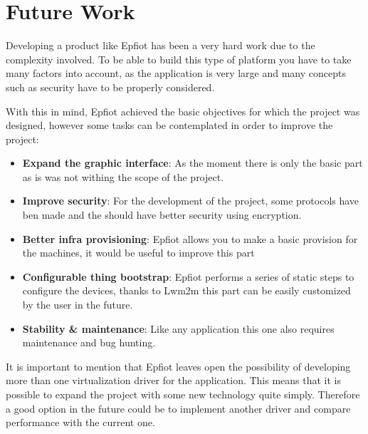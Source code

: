 \newpage
\section{Future Work}
\label{makereference7.2}

Developing a product like Epfiot has been a very hard work due to the complexity involved. To be able to build this type of platform you have to take many factors into account, as the application is very large and many concepts such as security have to be properly considered.

With this in mind, Epfiot achieved the basic objectives for which the project was designed, however some tasks can be contemplated in order to improve the project:

\begin{itemize}
    \item \textbf{Expand the graphic interface}: As the moment there is only the basic part as is was not withing the scope of the project.
    \item \textbf{Improve security}: For the development of the project, some protocols have ben made and the should have better security using encryption.
    \item \textbf{Better infra provisioning}: Epfiot allows you to make a basic provision for the machines, it would be useful to improve this part
    \item \textbf{Configurable thing bootstrap}: Epfiot performs a series of static steps to configure the devices, thanks to Lwm2m this part can be easily customized by the user in the future.
    \item \textbf{Stability \& maintenance}: Like any application this one also requires maintenance and bug hunting.
\end{itemize}

It is important to mention that Epfiot leaves open the possibility of developing more than one virtualization driver for the application. This means that it is possible to expand the project with some new technology quite simply. Therefore a good option in the future could be to implement another driver and compare performance with the current one.

